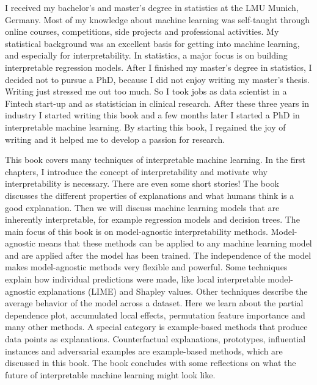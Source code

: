 \documentclass[
  10pt,
]{scrbook}
\begin{document}
I received my bachelor's and master's degree in statistics at the LMU Munich, Germany.
Most of my knowledge about machine learning was self-taught through online courses, competitions, side projects and professional activities.
My statistical background was an excellent basis for getting into machine learning, and especially for interpretability.
In statistics, a major focus is on building interpretable regression models.
After I finished my master's degree in statistics, I decided not to pursue a PhD, because I did not enjoy writing my master's thesis.
Writing just stressed me out too much.
So I took jobs as data scientist in a Fintech start-up and as statistician in clinical research.
After these three years in industry I started writing this book and a few months later I started a PhD in interpretable machine learning.
By starting this book, I regained the joy of writing and it helped me to develop a passion for research.

This book covers many techniques of interpretable machine learning.
In the first chapters, I introduce the concept of interpretability and motivate why interpretability is necessary.
There are even some short stories!
The book discusses the different properties of explanations and what humans think is a good explanation.
Then we will discuss machine learning models that are inherently interpretable, for example regression models and decision trees.
The main focus of this book is on model-agnostic interpretability methods.
Model-agnostic means that these methods can be applied to any machine learning model and are applied after the model has been trained.
The independence of the model makes model-agnostic methods very flexible and powerful.
Some techniques explain how individual predictions were made, like local interpretable model-agnostic explanations (LIME) and Shapley values.
Other techniques describe the average behavior of the model across a dataset.
Here we learn about the partial dependence plot, accumulated local effects, permutation feature importance and many other methods.
A special category is example-based methods that produce data points as explanations.
Counterfactual explanations, prototypes, influential instances and adversarial examples are example-based methods, which are discussed in this book.
The book concludes with some reflections on what the future of interpretable machine learning might look like.
\end{document}
